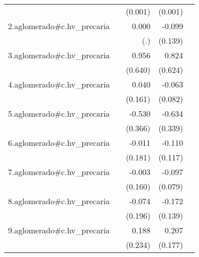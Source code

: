 {\begin{longtable}{l*{4}{D{.}{.}{-1}}}
            &                     &     (0.001)         &     (0.001)         &                     \\
\addlinespace
2.aglomerado#c.hv\_precaria&                     &       0.000         &      -0.099         &                     \\
            &                     &         (.)         &     (0.139)         &                     \\
\addlinespace
3.aglomerado#c.hv\_precaria&                     &       0.956         &       0.824         &                     \\
            &                     &     (0.640)         &     (0.624)         &                     \\
\addlinespace
4.aglomerado#c.hv\_precaria&                     &       0.040         &      -0.063         &                     \\
            &                     &     (0.161)         &     (0.082)         &                     \\
\addlinespace
5.aglomerado#c.hv\_precaria&                     &      -0.530         &      -0.634         &                     \\
            &                     &     (0.366)         &     (0.339)         &                     \\
\addlinespace
6.aglomerado#c.hv\_precaria&                     &      -0.011         &      -0.110         &                     \\
            &                     &     (0.181)         &     (0.117)         &                     \\
\addlinespace
7.aglomerado#c.hv\_precaria&                     &      -0.003         &      -0.097         &                     \\
            &                     &     (0.160)         &     (0.079)         &                     \\
\addlinespace
8.aglomerado#c.hv\_precaria&                     &      -0.074         &      -0.172         &                     \\
            &                     &     (0.196)         &     (0.139)         &                     \\
\addlinespace
9.aglomerado#c.hv\_precaria&                     &       0.188         &       0.207         &                     \\
            &                     &     (0.234)         &     (0.177)         &                     \\

\end{longtable}}
